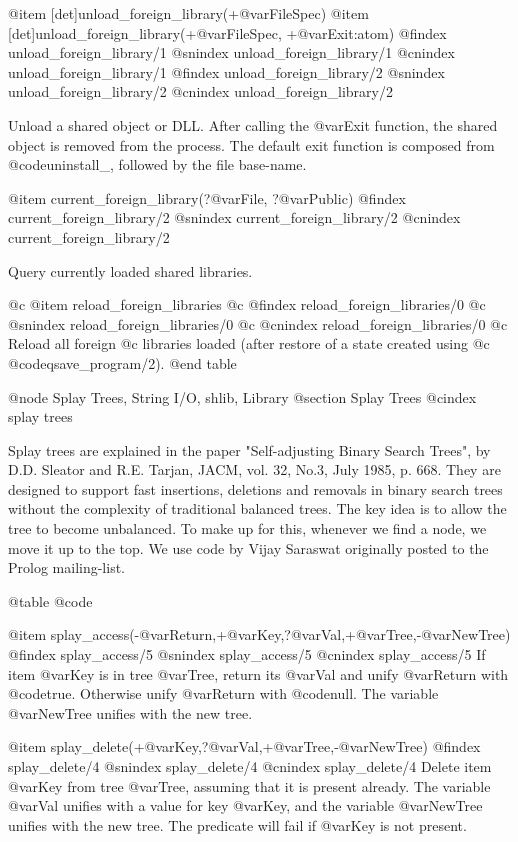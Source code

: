 {{{{{{{{@item [det]unload_foreign_library(+@var{FileSpec})
@item [det]unload_foreign_library(+@var{FileSpec}, +@var{Exit}:atom) 
@findex unload_foreign_library/1
@snindex unload_foreign_library/1
@cnindex unload_foreign_library/1
@findex unload_foreign_library/2
@snindex unload_foreign_library/2
@cnindex unload_foreign_library/2

Unload a shared
object or DLL. After calling the @var{Exit} function, the shared object is
removed from the process. The default exit function is composed from
@code{uninstall_}, followed by the file base-name.

@item current_foreign_library(?@var{File}, ?@var{Public}) 
@findex current_foreign_library/2
@snindex current_foreign_library/2
@cnindex current_foreign_library/2

Query currently
loaded shared libraries.  

@c @item reload_foreign_libraries 
@c @findex reload_foreign_libraries/0
@c @snindex reload_foreign_libraries/0
@c @cnindex reload_foreign_libraries/0
@c Reload all foreign
@c libraries loaded (after restore of a state created using
@c @code{qsave_program/2}).
@end table

@node Splay Trees, String I/O, shlib, Library
@section Splay Trees
@cindex splay trees

Splay trees are explained in the paper "Self-adjusting Binary Search
Trees", by D.D. Sleator and R.E. Tarjan, JACM, vol. 32, No.3, July 1985,
p. 668. They are designed to support fast insertions, deletions and
removals in binary search trees without the complexity of traditional
balanced trees. The key idea is to allow the tree to become
unbalanced. To make up for this, whenever we find a node, we move it up
to the top. We use code by Vijay Saraswat originally posted to the Prolog
mailing-list.

@table @code

@item splay_access(-@var{Return},+@var{Key},?@var{Val},+@var{Tree},-@var{NewTree})
@findex splay_access/5
@snindex splay_access/5
@cnindex splay_access/5
If item @var{Key} is in tree @var{Tree}, return its @var{Val} and
unify @var{Return} with @code{true}. Otherwise unify @var{Return} with
@code{null}. The variable @var{NewTree} unifies with the new tree.

@item splay_delete(+@var{Key},?@var{Val},+@var{Tree},-@var{NewTree})
@findex splay_delete/4
@snindex splay_delete/4
@cnindex splay_delete/4
Delete item @var{Key} from tree @var{Tree}, assuming that it is present
already. The variable @var{Val} unifies with a value for key @var{Key},
and the variable @var{NewTree} unifies with the new tree. The predicate
will fail if @var{Key} is not present.

}}}}}}}}
